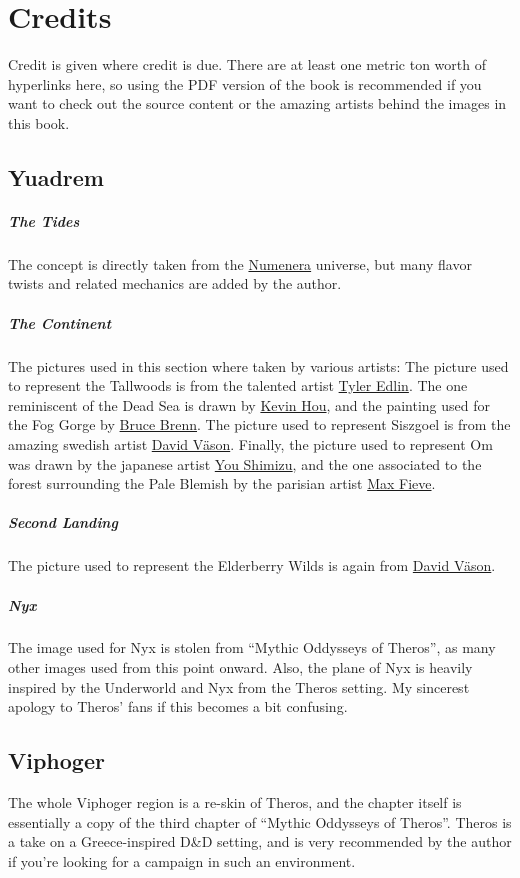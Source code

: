 \section{Credits}
Credit is given where credit is due.
There are at least one metric ton worth of hyperlinks here, so using the PDF version of the book is recommended if you want to check out the source content or the amazing artists behind the images in this book.

\subsection*{Yuadrem}
    \subparagraph{The Tides} The concept is directly taken from the \href{http://numenera.com/}{Numenera} universe, but many flavor twists and related mechanics are added by the author.

    \subparagraph{The Continent} The pictures used in this section where taken by various artists:
    The picture used to represent the Tallwoods is from the talented artist \href{https://www.artstation.com/tyleredlinart}{Tyler Edlin}.
    The one reminiscent of the Dead Sea is drawn by \href{https://www.artstation.com/knightblur}{Kevin Hou}, and the painting used for the Fog Gorge by \href{https://www.artstation.com/brucebrenn}{Bruce Brenn}.
    The picture used to represent Siszgoel is from the amazing swedish artist \href{https://www.artstation.com/davidvason}{David V\"ason}.
    Finally, the picture used to represent Om was drawn by the japanese artist \href{https://www.pixiv.net/en/users/2830609}{You Shimizu}, and the one associated to the forest surrounding the Pale Blemish by the parisian artist \href{https://www.artstation.com/maxfieve}{Max Fieve}.

    \subparagraph{Second Landing} The picture used to represent the Elderberry Wilds is again from \href{https://www.artstation.com/davidvason}{David V\"ason}.

    \subparagraph{Nyx} The image used for Nyx is stolen from ``Mythic Oddysseys of Theros'', as many other images used from this point onward.
    Also, the plane of Nyx is heavily inspired by the Underworld and Nyx from the Theros setting.
    My sincerest apology to Theros' fans if this becomes a bit confusing.

\subsection*{Viphoger}
    The whole Viphoger region is a re-skin of Theros, and the chapter itself is essentially a copy of the third chapter of ``Mythic Oddysseys of Theros''.
    Theros is a take on a Greece-inspired D\&D setting, and is very recommended by the author if you're looking for a campaign in such an environment.

